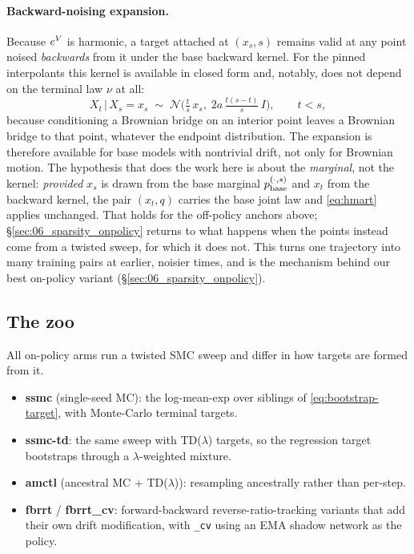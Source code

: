 \paragraph{Backward-noising expansion.}
Because $e^{V}$ is harmonic, a target attached at $(x_s,s)$ remains valid at
any point noised \emph{backwards} from it under the base backward kernel. For
the pinned interpolants this kernel is available in closed form and, notably,
does not depend on the terminal law $\nu$ at all:
\begin{equation}
  X_t \,\big|\, X_s = x_s \;\sim\; \mathcal{N}\!\Big(\tfrac{t}{s}\,x_s,\;
    2a\,\tfrac{t(s-t)}{s}\,I\Big),
  \qquad t<s,
  \label{eq:backward-kernel}
\end{equation}
because conditioning a Brownian bridge on an interior point leaves a Brownian
bridge to that point, whatever the endpoint distribution. The expansion is
therefore available for base models with nontrivial drift, not only for
Brownian motion. The hypothesis that does the work here is about the
\emph{marginal}, not the kernel: \emph{provided} $x_s$ is drawn from the base
marginal $p_{\mathrm{base}}^{(\cdot,s)}$ and $x_t$ from the backward kernel, the pair
$(x_t,q)$ carries the base joint law and \eqref{eq:hmart} applies unchanged.
That holds for the off-policy anchors above; \S\ref{sec:06_sparsity_onpolicy}
returns to what happens when the points instead come from a twisted sweep, for
which it does not. This turns one trajectory into many
training pairs at earlier, noisier times, and is the mechanism behind our best
on-policy variant (\S\ref{sec:06_sparsity_onpolicy}).

\subsection{The zoo}

All on-policy arms run a twisted SMC sweep and differ in how targets are
formed from it.

\begin{itemize}\itemsep2pt
\item \textbf{ssmc} (single-seed MC): the log-mean-exp over siblings of
  \eqref{eq:bootstrap-target}, with Monte-Carlo terminal targets.
\item \textbf{ssmc-td}: the same sweep with TD($\lambda$) targets, so the
  regression target bootstraps through a $\lambda$-weighted mixture.
\item \textbf{amctl} (ancestral MC + TD($\lambda$)): resampling ancestrally
  rather than per-step.
\item \textbf{fbrrt} / \textbf{fbrrt\_cv}: forward-backward
  reverse-ratio-tracking variants that add their own drift modification, with
  \texttt{\_cv} using an EMA shadow network as the policy.
\end{itemize}

